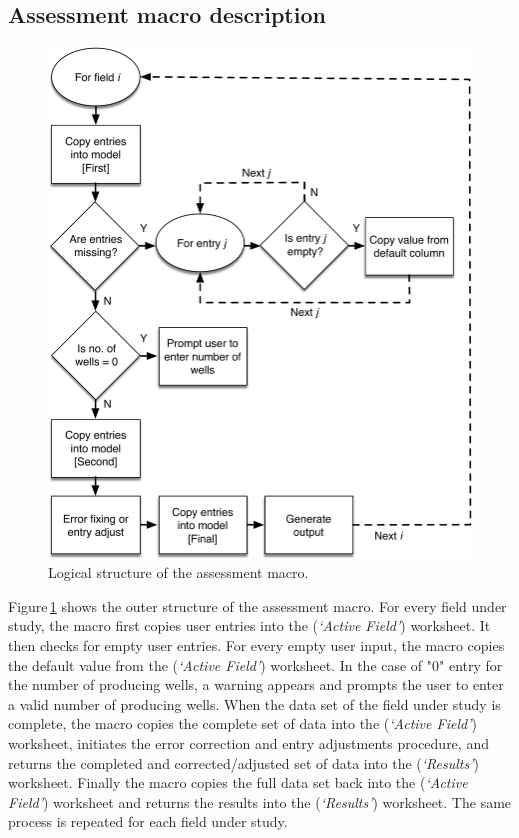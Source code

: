 \documentclass[11pt]{report}
\newcommand{\sheet}[1]{\textit{`{#1}'}}
\begin{document}
\subsection{Assessment macro description}
\begin{figure}[t]
\includegraphics[width=0.75\columnwidth]{images/MacroLogic1.pdf}
\caption{Logical structure of the assessment macro.}
\label{fig:macro_logic_1}
\end{figure}

Figure\,\ref{fig:macro_logic_1} shows the outer structure of the assessment macro. For every field under study, the macro first copies user entries into the (\sheet{Active Field}) worksheet. It then checks for empty user entries. For every empty user input, the macro copies the default value from the (\sheet{Active Field}) worksheet. In the case of "0" entry for the number of producing wells, a warning appears and prompts the user to enter a valid number of producing wells. When the data set of the field under study is complete, the macro copies the complete set of data into the (\sheet{Active Field}) worksheet, initiates the error correction and entry adjustments procedure, and returns the completed and corrected/adjusted set of data into the (\sheet{Results}) worksheet. Finally the macro copies the full data set back into the (\sheet{Active Field}) worksheet and returns the results into the (\sheet{Results}) worksheet. The same process is repeated for each field under study.
\end{document}
